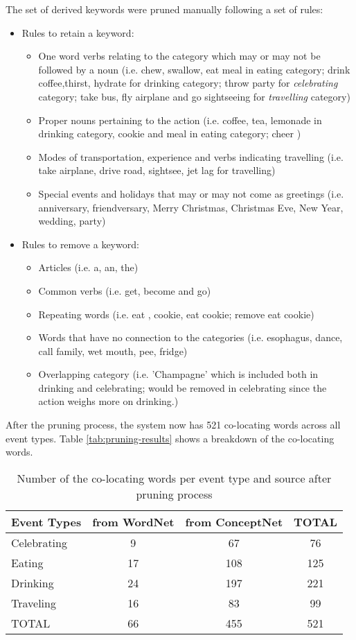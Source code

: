 The set of derived keywords were pruned manually following a set of rules:
\begin{itemize}
	\item Rules to retain a keyword:
	\begin{itemize}
		\item 	One word verbs relating to the category which may or may not be followed by a noun (i.e. chew, swallow, eat meal in eating category; drink coffee,thirst, hydrate for drinking category; throw party for \textit{celebrating} category; take bus, fly airplane and go sightseeing for \textit{travelling} category)
		\item Proper nouns pertaining to the action (i.e. coffee, tea, lemonade in drinking category, cookie and meal in eating category; cheer )
		\item Modes of transportation, experience and verbs indicating travelling (i.e. take airplane, drive road, sightsee, jet lag for travelling)
		\item Special events and holidays that may or may not come as greetings (i.e. anniversary, friendversary, Merry Christmas, Christmas Eve, New Year, wedding, party)
	\end{itemize}
	\item Rules to remove a keyword:
	\begin{itemize}
		\item Articles (i.e. a, an, the)
		\item Common verbs (i.e. get, become and go) 
		\item Repeating words (i.e. eat , cookie, eat cookie; remove eat cookie)
		\item Words that have no connection to the categories (i.e. esophagus, dance, call family, wet mouth, pee, fridge)
		\item Overlapping category (i.e. 'Champagne’ which is included both in drinking and celebrating; would be removed in celebrating since the action weighs more on drinking.)
	\end{itemize}
\end{itemize}

After the pruning process, the system now has 521 co-locating words across all event types. Table \ref{tab:pruning-results} shows a breakdown of the co-locating words.
\begin{table}[ph!]   %
	\centering
	\caption{Number of the co-locating words per event type and source after pruning process} \vspace{0.25em}
	\begin{tabular}{|p{1in}|c|c|c|} \hline
		\centering Event Types & from WordNet & from ConceptNet & TOTAL \\ \hline
		Celebrating & 9 & 67 & 76 \\ \hline
		Eating & 17 & 108 & 125 \\ \hline
		Drinking & 24 & 197 & 221 \\ \hline
		Traveling & 16 & 83 & 99 \\ \hline
		TOTAL & 66 & 455 & 521 \\ \hline
	\end{tabular}
	\label{tab:pruning-result}
\end{table}

